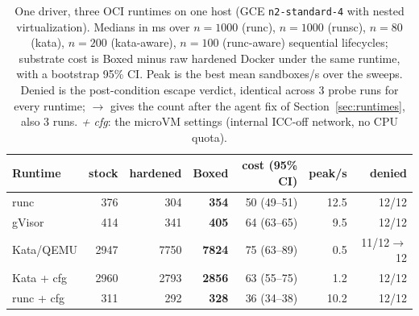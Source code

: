 \begin{table}[t]
\centering
\caption{One driver, three OCI runtimes on one host (GCE \texttt{n2-standard-4} with nested virtualization). Medians in ms over $n{=}1000$ (runc), $n{=}1000$ (runsc), $n{=}80$ (kata), $n{=}200$ (kata-aware), $n{=}100$ (runc-aware) sequential lifecycles; substrate cost is Boxed minus raw hardened Docker under the same runtime, with a bootstrap 95\% CI. Peak is the best mean sandboxes/s over the sweeps. Denied is the post-condition escape verdict, identical across 3 probe runs for every runtime; $\to$ gives the count after the agent fix of Section~\ref{sec:runtimes}, also 3 runs. \emph{+ cfg}: the microVM settings (internal ICC-off network, no CPU quota).}
\label{tab:runtimes}
\scriptsize
\setlength{\tabcolsep}{2pt}
\begin{tabular}{@{}lrrrrrr@{}}
\toprule
Runtime & stock & hardened & \textbf{Boxed} & cost (95\% CI) & peak/s & denied \\
\midrule
runc & 376 & 304 & \textbf{354} & 50 (49--51) & 12.5 & 12/12 \\
gVisor & 414 & 341 & \textbf{405} & 64 (63--65) & 9.5 & 12/12 \\
Kata/QEMU & 2947 & 7750 & \textbf{7824} & 75 (63--89) & 0.5 & 11/12$\to$12 \\
Kata + cfg & 2960 & 2793 & \textbf{2856} & 63 (55--75) & 1.2 & 12/12 \\
runc + cfg & 311 & 292 & \textbf{328} & 36 (34--38) & 10.2 & 12/12 \\
\bottomrule
\end{tabular}
\end{table}
